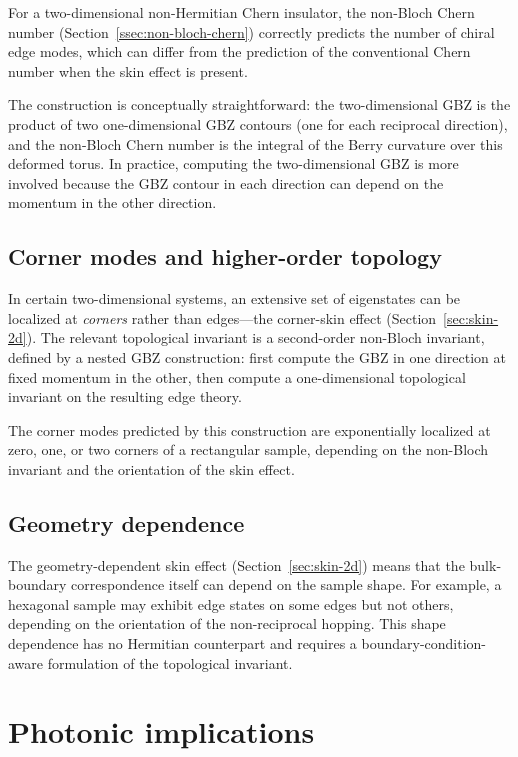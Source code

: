 For a two-dimensional non-Hermitian Chern insulator, the non-Bloch Chern
number (Section~\ref{ssec:non-bloch-chern}) correctly predicts the
number of chiral edge modes, which can differ from the prediction of the
conventional Chern number when the skin effect is present.

The construction is conceptually straightforward: the two-dimensional
GBZ is the product of two one-dimensional GBZ contours (one for each
reciprocal direction), and the non-Bloch Chern number is the integral
of the Berry curvature over this deformed torus. In practice, computing
the two-dimensional GBZ is more involved because the GBZ contour in
each direction can depend on the momentum in the other direction.

\subsection{Corner modes and higher-order topology}
\label{ssec:corner-modes}

In certain two-dimensional systems, an extensive set of eigenstates can
be localized at
\emph{corners} rather than edges---the corner-skin effect
(Section~\ref{sec:skin-2d}). The relevant topological invariant is a
second-order non-Bloch invariant, defined by a nested GBZ construction:
first compute the GBZ in one direction at fixed momentum in the other,
then compute a one-dimensional topological invariant on the resulting
edge theory.

The corner modes predicted by this construction are exponentially
localized at zero, one, or two corners of a rectangular sample, depending
on the non-Bloch invariant and the orientation of the skin effect.

\subsection{Geometry dependence}
\label{ssec:geometry-dependence}

The geometry-dependent skin effect (Section~\ref{sec:skin-2d}) means that
the bulk-boundary correspondence itself can depend on the sample shape.
For example, a hexagonal sample may exhibit edge states on some edges but
not others, depending on the orientation of the non-reciprocal hopping.
This shape dependence has no Hermitian counterpart and requires a
boundary-condition-aware formulation of the topological invariant.


\section{Photonic implications}
\label{sec:bbc-photonic}

